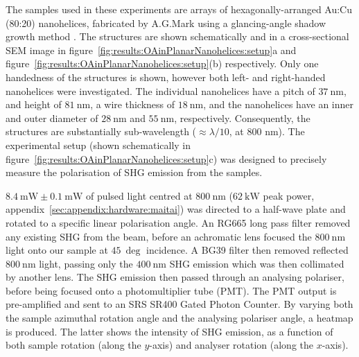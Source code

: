 The samples used in these experiments are arrays of hexagonally-arranged Au:Cu (80:20) nanohelices, fabricated by A.G.Mark using a glancing-angle shadow growth method \cite{Gibbs2014}. The structures are shown schematically and in a cross-sectional SEM image in figure~\ref{fig:results:OAinPlanarNanohelices:setup}a and figure~\ref{fig:results:OAinPlanarNanohelices:setup}(b) respectively. 
Only one handedness of the structures is shown, however both left- and right-handed nanohelices were investigated. The individual nanohelices have a pitch of $\SI{37}{\nano\m}$, and height of $\SI{81}{\nano\m}$, a wire thickness of $\SI{18}{\nano\m}$, and the nanohelices have an inner and outer diameter of $\SI{28}{\nano\m}$ and $\SI{55}{\nano\m}$, respectively. Consequently, the structures are substantially sub-wavelength ($\approx\lambda/10$, at 800 nm).
The experimental setup (shown schematically in figure~\ref{fig:results:OAinPlanarNanohelices:setup}c) was designed to precisely measure the polarisation of SHG emission from the samples. 

$\SI{8.4}{\milli\watt}\pm\SI{0.1}{\milli\watt}$ of pulsed light centred at $\SI{800}{\nano\m}$ ($\SI{62}{\kilo\watt}$ peak power, appendix~\ref{sec:appendix:hardware:maitai}) was directed to a half-wave plate and rotated to a specific linear polarisation angle. An RG665 long pass filter removed any existing SHG from the beam, before an achromatic lens focused the $\SI{800}{\nano\m}$ light onto our sample at $\SI{45}{\deg}$ incidence. A BG39 filter then removed reflected $\SI{800}{\nano\m}$ light, passing only the $\SI{400}{\nano\m}$ SHG emission which was then collimated by another lens. The SHG emission then passed through an analysing polariser, before being focused onto a photomultiplier tube (PMT). The PMT output is pre-amplified and sent to an SRS SR400 Gated Photon Counter. 
By varying both the sample azimuthal rotation angle and the analysing polariser angle, a heatmap is produced. The latter shows the intensity of SHG emission, as a function of both sample rotation (along the $y$-axis) and analyser rotation (along the $x$-axis). 

